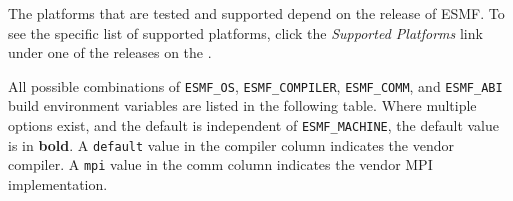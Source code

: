 

The platforms that are tested and supported depend on the release
of ESMF.  To see the specific list of supported platforms,
click the {\em Supported Platforms} link under one of the releases
on the .

All possible combinations of {\tt ESMF\_OS}, {\tt ESMF\_COMPILER}, {\tt ESMF\_COMM},
and {\tt ESMF\_ABI} build environment variables are listed in the following table.
Where multiple options exist, and the default is independent
of {\tt ESMF\_MACHINE}, the default value is in {\bf bold}.
A {\tt default} value in the compiler column indicates
the vendor compiler. A {\tt mpi} value in the comm column indicates
the vendor MPI implementation.

